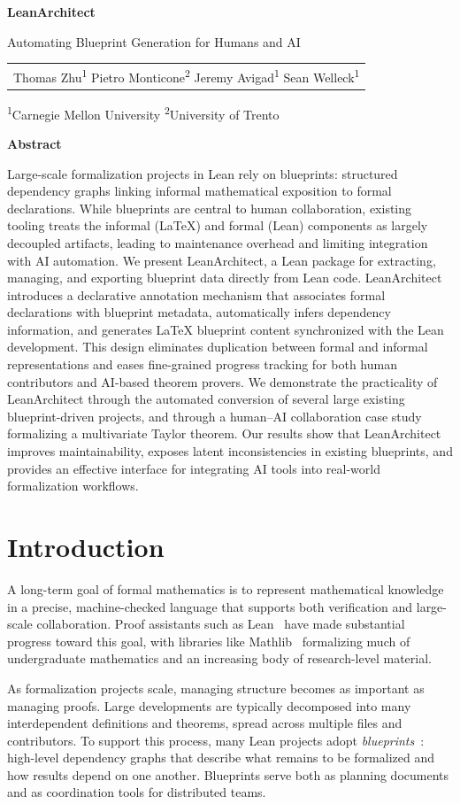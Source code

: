 \documentclass{article}
\newcommand\themaintitle{LeanArchitect}
\newcommand\thesubtitle{Automating Blueprint Generation for Humans and AI}
\renewcommand{\maketitle}{%
  \begin{center}
    \vspace*{1em}
    {\fontsize{28}{34}\selectfont\bfseries\themaintitle\par}
    \vspace{0.6em}
    {\fontsize{14}{18}\selectfont\thesubtitle\par}
    \vspace{1.5em}
    {\large\begin{tabular}[t]{c}
      Thomas Zhu\textsuperscript{1} \quad Pietro Monticone\textsuperscript{2} \quad Jeremy Avigad\textsuperscript{1} \quad Sean Welleck\textsuperscript{1}
    \end{tabular}\par}
    \vspace{0.8em}
    {\small\textsuperscript{1}Carnegie Mellon University \quad \textsuperscript{2}University of Trento\par}
    \vspace{1.5em}
  \end{center}
}
\newcommand{\leanarchitect}{LeanArchitect\xspace}
\renewenvironment{abstract}{%
  \begin{mdframed}[style=abstractstyle]
  {\small\bfseries\color{sectioncolor}Abstract}\par\vspace{0.4em}
  \small
}{%
  \end{mdframed}
}
\begin{document}
\maketitle

\begin{abstract}%
\noindent Large-scale formalization projects in Lean rely on blueprints: structured dependency graphs linking informal mathematical exposition to formal declarations. While blueprints are central to human collaboration, existing tooling treats the informal (\LaTeX{}) and formal (Lean) components as largely decoupled artifacts, leading to maintenance overhead and limiting integration with AI automation. We present \leanarchitect, a Lean package for extracting, managing, and exporting blueprint data directly from Lean code. \leanarchitect introduces a declarative annotation mechanism that associates formal declarations with blueprint metadata, automatically infers dependency information, and generates \LaTeX{} blueprint content synchronized with the Lean development. This design eliminates duplication between formal and informal representations and eases fine-grained progress tracking for both human contributors and AI-based theorem provers. We demonstrate the practicality of \leanarchitect through the automated conversion of several large existing blueprint-driven projects, and through a human--AI collaboration case study formalizing a multivariate Taylor theorem. Our results show that \leanarchitect improves maintainability, exposes latent inconsistencies in existing blueprints, and provides an effective interface for integrating AI tools into real-world formalization workflows.
\end{abstract}

\newpage

\section{Introduction}

A long-term goal of formal mathematics is to represent mathematical knowledge in a precise, machine-checked language that supports both verification and large-scale collaboration. Proof assistants such as Lean~\cite{demoura2015lean, demoura2021lean} have made substantial progress toward this goal, with libraries like Mathlib~\cite{The_mathlib_Community_2020} formalizing much of undergraduate mathematics and an increasing body of research-level material.

As formalization projects scale, managing structure becomes as important as managing proofs. Large developments are typically decomposed into many interdependent definitions and theorems, spread across multiple files and contributors. To support this process, many Lean projects adopt \emph{blueprints}~\cite{massot_leanblueprint}: high-level dependency graphs that describe what remains to be formalized and how results depend on one another. Blueprints serve both as planning documents and as coordination tools for distributed teams.
\end{document}
